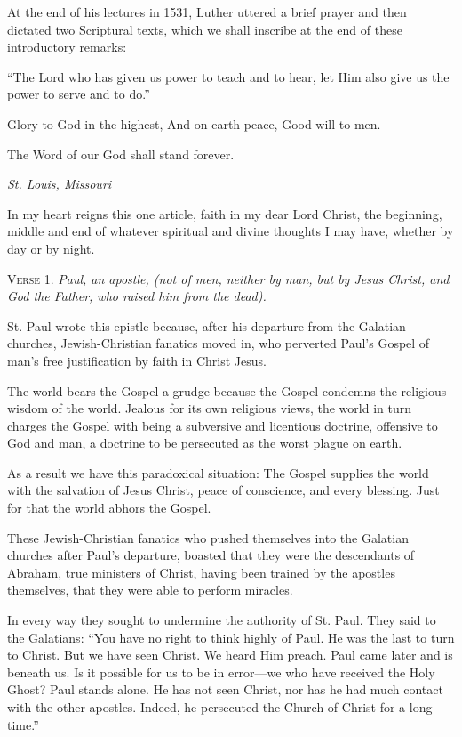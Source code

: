 At the end of his lectures in 1531, Luther uttered a brief prayer and then dictated two Scriptural texts, which we shall inscribe at the end of these introductory remarks:

“The Lord who has given us power to teach and to hear, let Him also give us the power to serve and to do.”

Glory to God in the highest, And on earth peace, Good will to men.

The Word of our God  shall stand forever.

\emph{St. Louis, Missouri}


In my heart reigns this one article, faith in my dear Lord Christ, the beginning, middle and end of whatever spiritual and divine thoughts I may have, whether by day or by night.


\textsc{Verse} 1. \emph{Paul, an apostle, (not of men, neither by man, but by Jesus Christ, and God the Father, who raised him from the dead).}

St. Paul wrote this epistle because, after his departure from the Galatian churches, Jewish-Christian fanatics moved in, who perverted Paul’s Gospel of man’s free justification by faith in Christ Jesus.

The world bears the Gospel a grudge because the Gospel condemns the religious wisdom of the world. Jealous for its own religious views, the world in turn charges the Gospel with being a subversive and licentious doctrine, offensive to God and man, a doctrine to be persecuted as the worst plague on earth.

As a result we have this paradoxical situation: The Gospel supplies the world with the salvation of Jesus Christ, peace of conscience, and every blessing. Just for that the world abhors the Gospel.

These Jewish-Christian fanatics who pushed themselves into the Galatian churches after Paul’s departure, boasted that they were the descendants of Abraham, true ministers of Christ, having been trained by the apostles themselves, that they were able to perform miracles.

In every way they sought to undermine the authority of St. Paul. They said to the Galatians: “You have no right to think highly of Paul. He was the last to turn to Christ. But we have seen Christ. We heard Him preach. Paul came later and is beneath us. Is it possible for us to be in error—we who have received the Holy Ghost? Paul stands alone. He has not seen Christ, nor has he had much contact with the other apostles. Indeed, he persecuted the Church of Christ for a long time.”

